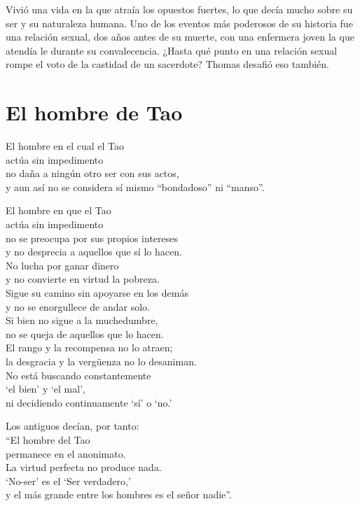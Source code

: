 \documentclass[book,b5paper,hidelinks,final]{memoir}
\begin{document}
	Vivió una vida en la que atraía los opuestos fuertes, lo que decía mucho
	sobre su ser y su naturaleza humana. Uno de los eventos más poderosos de
	su historia fue una relación sexual, dos años antes de su muerte, con
	una enfermera joven la que atendía le durante su convalecencia. ¿Hasta
	qué punto en una relación sexual rompe el voto de la castidad de un
	sacerdote? Thomas desafió eso también.
	
	\chapter*{El hombre de Tao}
	
	El hombre en el cual el Tao\\
	actúa sin impedimento\\
	no daña a ningún otro ser con sus actos,\\
	y aun así no se considera sí mismo ``bondadoso'' ni ``manso''.
	
	El hombre en que el Tao\\
	actúa sin impedimento\\
	no se preocupa por sus propios intereses\\
	y no desprecia a aquellos que sí lo hacen.\\
	No lucha por ganar dinero\\
	y no convierte en virtud la pobreza.\\
	Sigue su camino sin apoyarse en los demás\\
	y no se enorgullece de andar solo.\\
	Si bien no sigue a la muchedumbre,\\
	no se queja de aquellos que lo hacen.\\
	El rango y la recompensa no lo atraen;\\
	la desgracia y la vergüenza no lo desaniman.\\
	No está buscando constantemente\\
	`el bien' y `el mal',\\
	ni decidiendo continuamente `sí' o `no.'
	
	Los antiguos decían, por tanto:\\
	``El hombre del Tao\\
	permanece en el anonimato.\\
	La virtud perfecta no produce nada.\\
	`No-ser' es el `Ser verdadero,'\\
	y el más grande entre los hombres es el señor nadie''.
	
\end{document}
